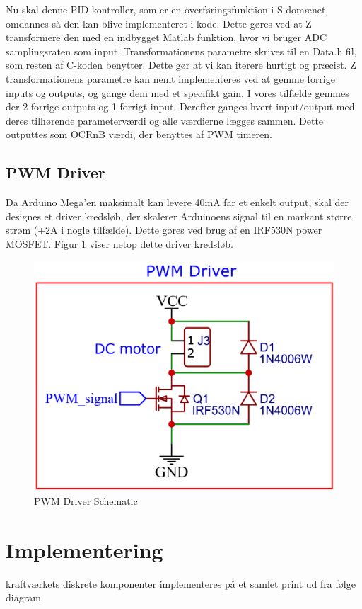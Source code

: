 \documentclass[../main.tex]{subfiles}
\begin{document}
Nu skal denne PID kontroller, som er en overføringsfunktion i S-domænet, omdannes så den kan blive implementeret i kode. Dette gøres ved at Z transformere den med en indbygget Matlab funktion, hvor vi bruger ADC samplingsraten som input. Transformationens parametre skrives til en Data.h fil, som resten af C-koden benytter. Dette gør at vi kan iterere hurtigt og præcist. Z transformationens parametre kan nemt implementeres ved at gemme forrige inputs og outputs, og gange dem med et specifikt gain. I vores tilfælde gemmes der 2 forrige outputs og 1 forrigt input. Derefter ganges hvert input/output med deres tilhørende parameterværdi og alle værdierne lægges sammen. Dette outputtes som OCRnB værdi, der benyttes af PWM timeren.

\subsection{PWM Driver}
Da Arduino Mega'en maksimalt kan levere 40mA far et enkelt output, skal der designes et driver kredsløb, der skalerer Arduinoens signal til en markant større strøm (+2A i nogle tilfælde). Dette gøres ved brug af en IRF530N power MOSFET. Figur \ref{fig: PWM Driver Schematic} viser netop dette driver kredsløb.
\begin{figure}[H]
      \includegraphics[width=\textwidth]{Dokumentation/Figures/PWM_Driver.png}
     \caption{PWM Driver Schematic}
     \label{fig: PWM Driver Schematic}
     \end{figure}

\section{Implementering}
kraftværkets diskrete komponenter implementeres på et samlet print ud fra følge diagram
\end{document}
